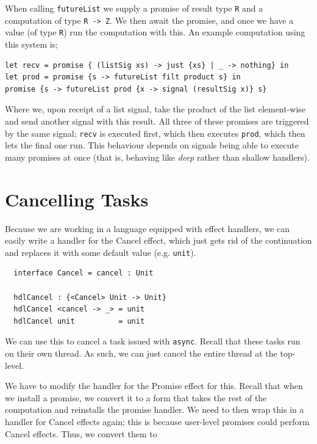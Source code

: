\documentclass[msc,deptreport,cs]{infthesis} %
\newcommand{\code}[1]{\lstinline{#1}}
\newcommand{\todo}[1]
           {{\par\noindent\small\color{RoyalPurple}
  \framebox{\parbox{\dimexpr\linewidth-2\fboxsep-2\fboxrule}
    {\textbf{TODO:} #1}}}}
\begin{document}
\noindent When calling \code{futureList} we supply a promise of result type
\code{R} and a computation of type \code{R -> Z}. We then await the promise, and
once we have a value (of type \code{R}) run the computation with this. An
example computation using this system is;

\begin{lstlisting}
let recv = promise { (listSig xs) -> just {xs} | _ -> nothing} in
let prod = promise {s -> futureList filt product s} in
promise {s -> futureList prod {x -> signal (resultSig x)} s}
\end{lstlisting}

\noindent Where we, upon receipt of a list signal, take the product of the list
element-wise and send another signal with this result. All three of these
promises are triggered by the same signal; \code{recv} is executed first, which
then executes \code{prod}, which then lets the final one run. This behaviour
depends on signals being able to execute many promises at once (that is,
behaving like \emph{deep} rather than shallow handlers).

\section{Cancelling Tasks}

\todo{Link back to the async/await w/ dynamic}

Because we are working in a language equipped with effect handlers, we can
easily write a handler for the \textsf{Cancel} effect, which just gets rid of
the continuation and replaces it with some default value (e.g. \code{unit}).

\begin{lstlisting}
  interface Cancel = cancel : Unit
 
  hdlCancel : {<Cancel> Unit -> Unit}
  hdlCancel <cancel -> _> = unit
  hdlCancel unit          = unit
\end{lstlisting}

We can use this to cancel a task issued with \code{async}. Recall that these
tasks run on their own thread. As such, we can just cancel the entire thread at
the top-level.

We have to modify the handler for the \textsf{Promise} effect for this. Recall
that when we install a promise, we convert it to a form that takes the rest of
the computation and reinstalls the promise handler. We need to then wrap this in
a handler for \textsf{Cancel} effects again; this is because user-level promises
could perform \textsf{Cancel} effects. Thus, we convert them to
\end{document}
